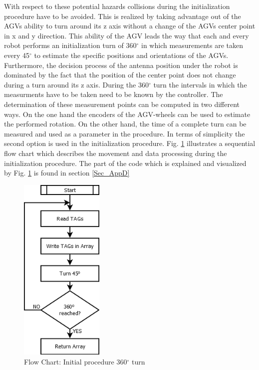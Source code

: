 With respect to these potential hazards collisions during the initialization procedure have to be avoided. This is realized by taking advantage out of the AGVs ability to turn around its z axis without a change of the AGVs center point in x and y direction. This ability of the AGV leads the way that each and every robot performs an initialization turn of 360$^\circ$ in which measurements are taken every 45$^\circ$ to estimate the specific positions and orientations of the AGVs. Furthermore, the decision process of the antenna position under the robot is dominated by the fact that the position of the center point does not change during a turn around its z axis. 
During the 360$^\circ$ turn the intervals in which the measurments have to be taken need to be known by the controller. The determination of these measurement points can be computed in two different ways. On the one hand the encoders of the AGV-wheels can be used to estimate the performed rotation. On the other hand, the time of a complete turn can be measured and used as a parameter in the procedure. In terms of simplicity the second option is used in the initialization procedure.  
Fig. \ref{SFC_Init_Procedure} illustrates a sequential flow chart which describes the movement and data processing during the initialization procedure. The part of the code which is explained and visualized by Fig. \ref{SFC_Init_Procedure} is found in section \ref{Sec_AppD} \\ 
\begin{figure}[!htbp]
\centering
\includegraphics[width = 4cm]{Pictures/SFC_Init_Procedure}
\caption{Flow Chart: Initial procedure 360$^\circ$ turn}
\label{SFC_Init_Procedure}
\end{figure}\\\\\\\\\\\\\\\\
